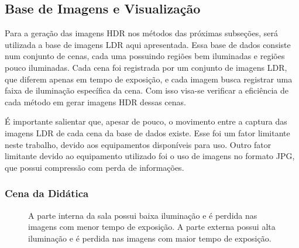 \subsection{Base de Imagens e Visualização} \label{metodoBaseImg}

Para a geração das imagens HDR nos métodos das próximas subseções, será utilizada a base de imagens LDR aqui apresentada. Essa base de dados consiste num conjunto de cenas, cada uma possuindo regiões bem iluminadas e regiões pouco iluminadas. Cada cena foi registrada por um conjunto de imagens LDR, que diferem apenas em tempo de exposição, e cada imagem busca registrar uma faixa de iluminação específica da cena. Com isso visa-se verificar a eficiência de cada método em gerar imagens HDR dessas cenas.

É importante salientar que, apesar de pouco, o movimento entre a captura das imagens LDR de cada cena da base de dados existe. Esse foi um fator limitante neste trabalho, devido aos equipamentos disponíveis para uso. Outro fator limitante devido ao equipamento utilizado foi o uso de imagens no formato JPG, que possui compressão com perda de informações.

\subsubsection{Cena da Didática} \label{cenaDidatica}

\begin{figure}[H]
  \quad %
  \quad %
  \quad %
  \quad %
  \caption{A parte interna da sala possui baixa iluminação e é perdida nas imagens com menor tempo de exposição. A parte externa possui alta iluminação e é perdida nas imagens com maior tempo de exposição.}
  \label{figBaseDidaticas}
\end{figure}

